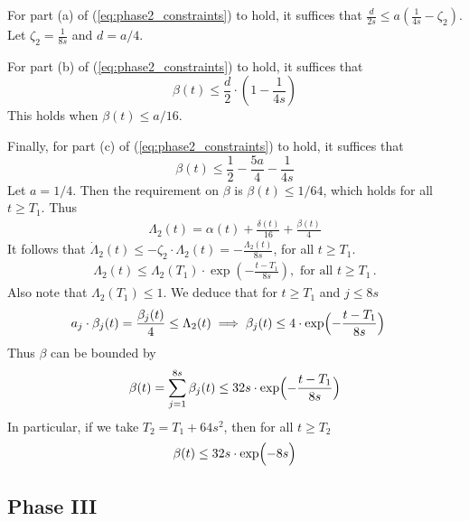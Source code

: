 \documentclass[a4paper,12pt]{article}
\begin{document}
For part (a) of (\ref{eq:phase2_constraints}) to hold, it suffices that $\frac{d}{2s} \leq a \left(\frac{1}{4s} - \zeta_{2} \right)$.
Let $\zeta_{2} = \frac{1}{8s}$ and $d = a/4$.

For part (b) of (\ref{eq:phase2_constraints}) to hold, it suffices that
$$
\beta(t) \leq \frac{d}{2} \cdot \left( 1 - \frac{1}{4s} \right)
$$
This holds when $\beta(t) \leq a/16$.

Finally, for part (c) of (\ref{eq:phase2_constraints}) to hold, it suffices that
$$
\beta(t) \leq \frac{1}{2} - \frac{5a}{4} - \frac{1}{4s}
$$
Let $a = 1/4$. Then the requirement on $\beta$ is $\beta(t) \leq 1/64$, which holds for all $t \geq T_1$.
Thus
\begin{align} \label{eq:lambda2_definition_exact_coeffs}
\Lambda_2(t) = \alpha(t) + \frac{\delta(t)}{16} + \frac{\beta(t)}{4}
\end{align}
It follows that $\dot{\Lambda}_{2}(t) \leq - \zeta_{2} \cdot \Lambda_{2}(t) = - \frac{\Lambda_{2}(t)}{8s}$, for all $t \geq T_1$.
\begin{align} \label{eq:lambda2_beyond_T1}
\Lambda_{2}(t) \leq \Lambda_{2}(T_1) \cdot \exp\left(-\frac{t - T_1}{8s}\right), \mbox{ for all } t \geq T_1\,.
\end{align}
Also note that $\Lambda_{2}(T_1) \leq 1$. We deduce that for $t \geq T_1$ and $j \leq 8s$
\begin{align}
a_j \cdot \beta_j(t) & = \frac{\beta_j(t)}{4} \leq \Lambda_{2}(t)
\implies \beta_j(t) \leq 4 \cdot \exp\Bigl(-\frac{t-T_1}{8s}\Bigr)
\end{align}
Thus $\beta$ can be bounded by
\begin{align}
\beta(t) = \sum_{j=1}^{8s} \beta_j(t) \leq  32s \cdot \exp\Bigl(-\frac{t-T_1}{8s}\Bigr)
\end{align}
In particular, if we take $T_2 = T_1 + 64 s^2$, then for all $t \geq T_2$
\begin{align} \label{eq:beta_ub_end_phase2}
\beta(t) \leq 32 s \cdot \exp\Bigl( -8s \Bigr)
\end{align}

\subsection{Phase III} \label{sec:phase_3}
\end{document}
